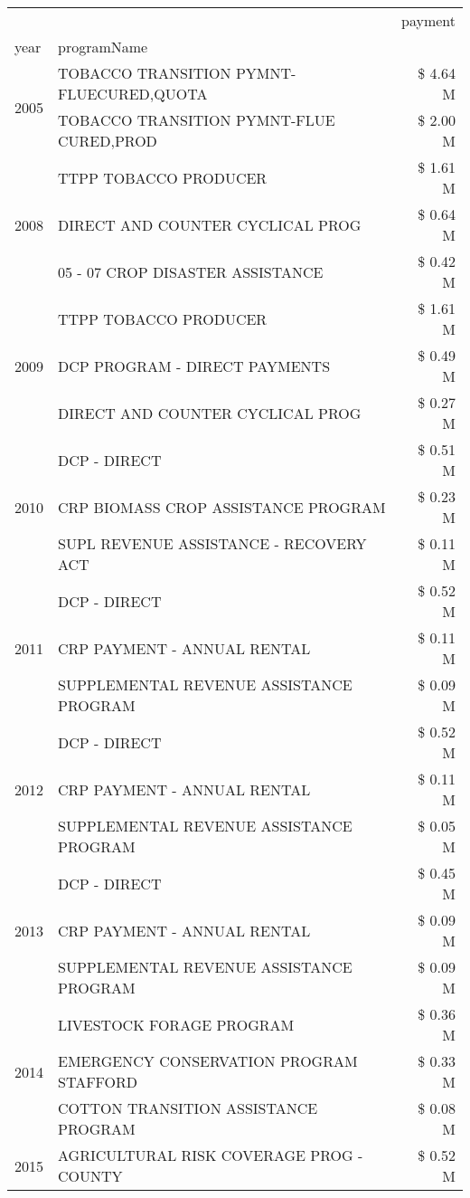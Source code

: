 \begin{tabular}{llr}
\toprule
 &  & payment \\
year & programName &  \\
\midrule
\multirow[t]{2}{*}{2005} & TOBACCO TRANSITION PYMNT-FLUECURED,QUOTA & \$ 4.64 M \\
 & TOBACCO TRANSITION PYMNT-FLUE CURED,PROD & \$ 2.00 M \\
\cline{1-3}
\multirow[t]{3}{*}{2008} & TTPP TOBACCO PRODUCER & \$ 1.61 M \\
 & DIRECT AND COUNTER CYCLICAL PROG & \$ 0.64 M \\
 & 05 - 07 CROP DISASTER ASSISTANCE & \$ 0.42 M \\
\cline{1-3}
\multirow[t]{3}{*}{2009} & TTPP TOBACCO PRODUCER & \$ 1.61 M \\
 & DCP PROGRAM - DIRECT PAYMENTS & \$ 0.49 M \\
 & DIRECT AND COUNTER CYCLICAL PROG & \$ 0.27 M \\
\cline{1-3}
\multirow[t]{3}{*}{2010} & DCP - DIRECT & \$ 0.51 M \\
 & CRP BIOMASS CROP ASSISTANCE PROGRAM & \$ 0.23 M \\
 & SUPL REVENUE ASSISTANCE - RECOVERY ACT & \$ 0.11 M \\
\cline{1-3}
\multirow[t]{3}{*}{2011} & DCP - DIRECT & \$ 0.52 M \\
 & CRP PAYMENT - ANNUAL RENTAL & \$ 0.11 M \\
 & SUPPLEMENTAL REVENUE ASSISTANCE PROGRAM & \$ 0.09 M \\
\cline{1-3}
\multirow[t]{3}{*}{2012} & DCP - DIRECT & \$ 0.52 M \\
 & CRP PAYMENT - ANNUAL RENTAL & \$ 0.11 M \\
 & SUPPLEMENTAL REVENUE ASSISTANCE PROGRAM & \$ 0.05 M \\
\cline{1-3}
\multirow[t]{3}{*}{2013} & DCP - DIRECT & \$ 0.45 M \\
 & CRP PAYMENT - ANNUAL RENTAL & \$ 0.09 M \\
 & SUPPLEMENTAL REVENUE ASSISTANCE PROGRAM & \$ 0.09 M \\
\cline{1-3}
\multirow[t]{3}{*}{2014} & LIVESTOCK FORAGE PROGRAM & \$ 0.36 M \\
 & EMERGENCY CONSERVATION PROGRAM STAFFORD & \$ 0.33 M \\
 & COTTON TRANSITION ASSISTANCE PROGRAM & \$ 0.08 M \\
\cline{1-3}
\multirow[t]{3}{*}{2015} & AGRICULTURAL RISK COVERAGE PROG - COUNTY & \$ 0.52 M \\

\end{tabular}
